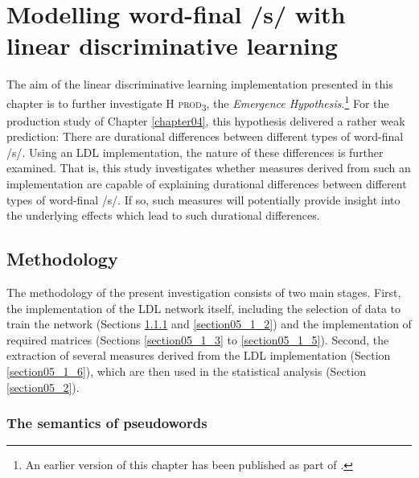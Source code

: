 \chapter{Modelling word-final /s/ with linear discriminative learning}\label{chapter05}

The aim of the linear discriminative learning implementation presented in this chapter is to further investigate \textsc{H prod\textsubscript{3}}, the \textit{Emergence Hypothesis}.\footnote{An earlier version of this chapter has been published as part of \citet{Schmitz2021b}.} For the production study of Chapter \ref{chapter04}, this hypothesis delivered a rather weak prediction: There are durational differences between different types of word-final /s/. Using an LDL implementation, the nature of these differences is further examined. That is, this study investigates whether measures derived from such an implementation are capable of explaining durational differences between different types of word-final /s/. If so, such measures will potentially provide insight into the underlying effects which lead to such durational differences.

\section{Methodology}\label{section05_1}

The methodology of the present investigation consists of two main stages. First, the implementation of the LDL network itself, including the selection of data to train the network (Sections \ref{section05_1_1} and \ref{section05_1_2}) and the implementation of required matrices (Sections \ref{section05_1_3} to \ref{section05_1_5}). Second, the extraction of several measures derived from the LDL implementation (Section \ref{section05_1_6}), which are then used in the statistical analysis (Section \ref{section05_2}).

\subsection{The semantics of pseudowords}\label{section05_1_1}

